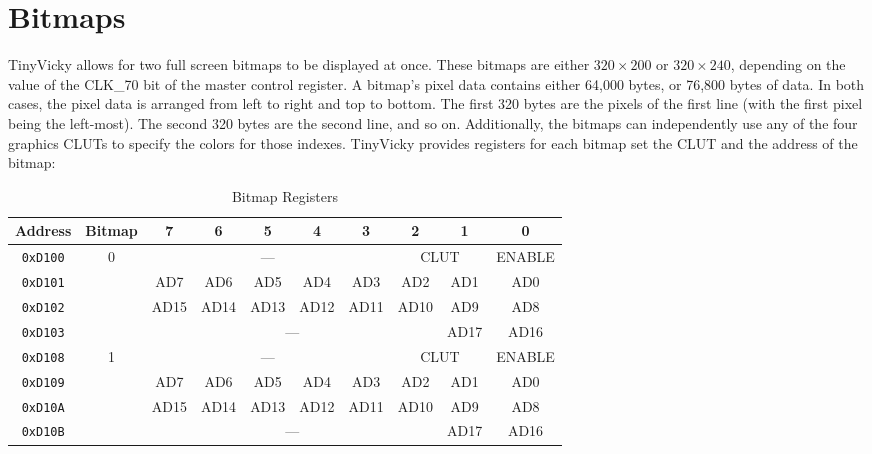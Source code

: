 \section{Bitmaps}

TinyVicky allows for two full screen bitmaps to be displayed at once. These bitmaps are either $320 \times 200$ or $320 \times 240$, depending on the value of the CLK\_70 bit of the master control register. A bitmap's pixel data contains either 64,000 bytes, or 76,800 bytes of data. In both cases, the pixel data is arranged from left to right and top to bottom. The first 320 bytes are the pixels of the first line (with the first pixel being the left-most). The second 320 bytes are the second line, and so on. Additionally, the bitmaps can independently use any of the four graphics CLUTs to specify the colors for those indexes. TinyVicky provides registers for each bitmap set the CLUT and the address of the bitmap:

\begin{table}[h]
    \begin{center}
        \begin{tabular}{|c|c|c|c|c|c|c|c|c|c|} \hline
            Address & Bitmap & 7 & 6 & 5 & 4 & 3 & 2 & 1 & 0 \\ \hline\hline
            \verb+0xD100+ & \multirow{4}{*}{0} & \multicolumn{5}{|c|}{---} & \multicolumn{2}{|c|}{CLUT} & ENABLE \\\cline{1-1}\cline{3-10}
            \verb+0xD101+ & & AD7 & AD6 & AD5 & AD4 & AD3 & AD2 & AD1 & AD0 \\\cline{1-1}\cline{3-10}
            \verb+0xD102+ & & AD15 & AD14 & AD13 & AD12 & AD11 & AD10 & AD9 & AD8 \\\cline{1-1}\cline{3-10}
            \verb+0xD103+ & & \multicolumn{6}{|c|}{---} & AD17 & AD16 \\ \hline
            \verb+0xD108+ & \multirow{4}{*}{1} & \multicolumn{5}{|c|}{---} & \multicolumn{2}{|c|}{CLUT} & ENABLE \\\cline{1-1}\cline{3-10}
            \verb+0xD109+ & & AD7 & AD6 & AD5 & AD4 & AD3 & AD2 & AD1 & AD0 \\\cline{1-1}\cline{3-10}
            \verb+0xD10A+ & & AD15 & AD14 & AD13 & AD12 & AD11 & AD10 & AD9 & AD8 \\\cline{1-1}\cline{3-10}
            \verb+0xD10B+ & & \multicolumn{6}{|c|}{---} & AD17 & AD16 \\ \hline
        \end{tabular}
    \end{center}
    \caption{Bitmap Registers}
    \label{tab:bm_registers}
\end{table}

